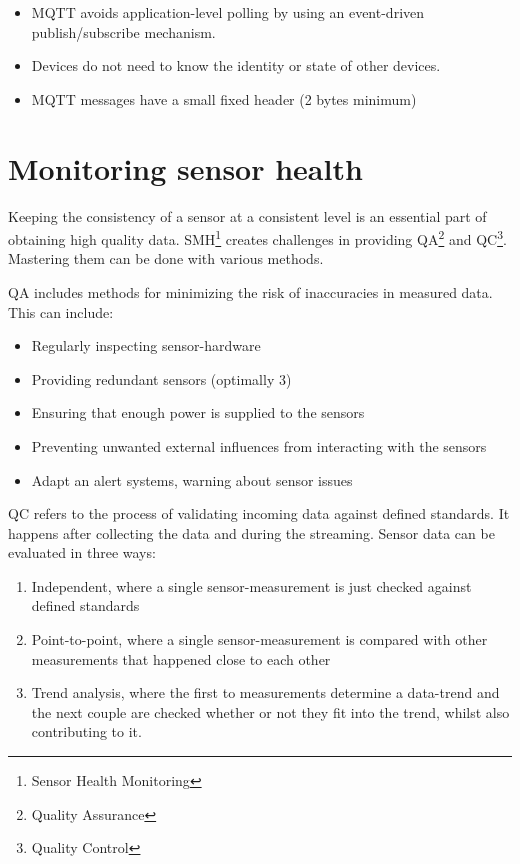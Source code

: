 \begin{itemize}
    \item MQTT avoids application-level polling by using an event-driven publish/subscribe mechanism.
    \item Devices do not need to know the identity or state of other devices.
    \item MQTT messages have a small fixed header (2 bytes minimum)
\end{itemize}

\cite{LRWeb:38, LRWeb:39}

\section{Monitoring sensor health}
Keeping the consistency of a sensor at a consistent level is an essential part of obtaining high quality data. SMH\footnote{Sensor Health Monitoring} creates challenges in providing QA\footnote{Quality Assurance} and QC\footnote{Quality Control}. Mastering them can be done with various methods.

QA includes methods for minimizing the risk of inaccuracies in measured data. This can include:
\begin{itemize}
    \item Regularly inspecting sensor-hardware
    \item Providing redundant sensors (optimally 3)
    \item Ensuring that enough power is supplied to the sensors
    \item Preventing unwanted external influences from interacting with the sensors
    \item Adapt an alert systems, warning about sensor issues
\end{itemize}

QC refers to the process of validating incoming data against defined standards. It happens after collecting the data and during the streaming. Sensor data can be evaluated in three ways:
\begin{enumerate}
    \item Independent, where a single sensor-measurement is just checked against defined standards
    \item Point-to-point, where a single sensor-measurement is compared with other measurements that happened close to each other
    \item Trend analysis, where the first to measurements determine a data-trend and the next couple are checked whether or not they fit into the trend, whilst also contributing to it.
\end{enumerate}
\cite{LRWeb:64}
